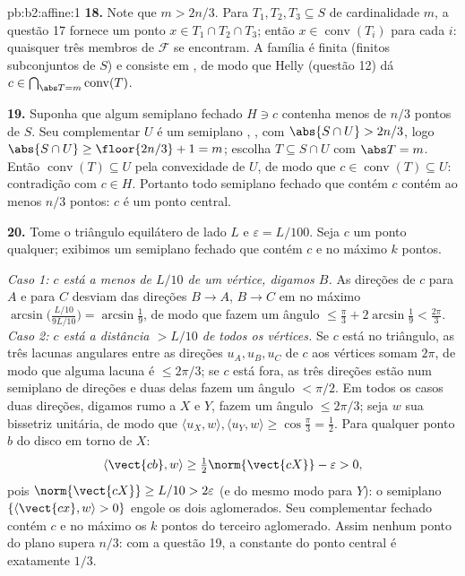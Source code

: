 \begin{solution}{pb:b2:affine:1}
\textbf{18.} Note que $m > 2n/3$. Para $T_1, T_2, T_3 \subseteq S$
de cardinalidade $m$, a questão 17 fornece um ponto $x \in T_1
\cap T_2 \cap T_3$; então $x \in \operatorname{conv}(T_i)$ para
cada $i$: quaisquer três membros de $\mathcal F$ se encontram. A família
é finita (finitos subconjuntos de $S$) e consiste em
, de modo que Helly (questão 12) dá $c \in
\bigcap_{\abs T = m}\operatorname{conv}(T)$.

\textbf{19.} Suponha que algum semiplano fechado $H \ni c$
contenha menos de $n/3$ pontos de $S$. Seu complementar $U$
é um semiplano , , com $\abs{S \cap U} > 2n/3$,
logo $\abs{S \cap U} \geq \floor{2n/3} + 1 = m$; escolha $T
\subseteq S \cap U$ com $\abs T = m$. Então
$\operatorname{conv}(T) \subseteq U$ pela convexidade de $U$, de modo que
$c \in \operatorname{conv}(T) \subseteq U$: contradição
com $c \in H$. Portanto todo semiplano fechado que contém $c$
contém ao menos $n/3$ pontos: $c$ é um ponto central.

\textbf{20.} Tome o triângulo equilátero de lado $L$ e
$\varepsilon = L/100$. Seja $c$ um ponto qualquer; exibimos um
semiplano fechado que contém $c$ e no máximo $k$ pontos.

\emph{Caso 1: $c$ está a menos de $L/10$ de um vértice, digamos $B$.}
As direções de $c$ para $A$ e para $C$ desviam das
direções $B \to A$, $B \to C$ em no máximo
$\arcsin\bigl(\tfrac{L/10}{9L/10}\bigr) = \arcsin\tfrac19$,
de modo que fazem um ângulo $\leq \tfrac\pi3 + 2\arcsin\tfrac19 <
\tfrac{2\pi}3$. \emph{Caso 2: $c$ está a distância $> L/10$
de todos os vértices.} Se $c$ está no triângulo, as três
lacunas angulares entre as direções $u_A, u_B, u_C$ de $c$
aos vértices somam $2\pi$, de modo que alguma lacuna é $\leq 2\pi/3$;
se $c$ está fora, as três direções estão num semiplano
 de direções e duas delas fazem um ângulo $<
\pi/2$. Em todos os casos duas direções, digamos rumo a $X$ e $Y$,
fazem um ângulo $\leq 2\pi/3$; seja $w$ sua bissetriz unitária,
de modo que $\langle u_X, w\rangle, \langle u_Y, w\rangle \geq
\cos\tfrac\pi3 = \tfrac12$. Para qualquer ponto $b$ do disco
em torno de $X$:
\[
\langle \vect{cb}, w\rangle \geq
\tfrac12\norm{\vect{cX}} - \varepsilon > 0,
\]
pois $\norm{\vect{cX}} \geq L/10 > 2\varepsilon$ (e
do mesmo modo para $Y$): o semiplano  $\{\langle \vect{cx},
w\rangle > 0\}$ engole os dois aglomerados. Seu complementar
fechado contém $c$ e no máximo os $k$ pontos do
terceiro aglomerado. Assim nenhum ponto do plano supera $n/3$: com
a questão 19, a constante do ponto central é exatamente $1/3$.


\end{solution}
